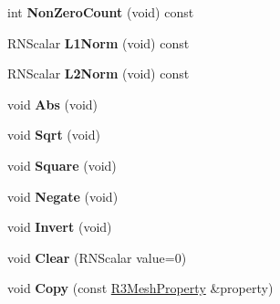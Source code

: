 \begin{DoxyCompactItemize}
\item 
int {\bfseries Non\+Zero\+Count} (void) const \hypertarget{struct_r3_mesh_property_ad5075bcb7fc35636d7ecd8b8ab838c62}{}\label{struct_r3_mesh_property_ad5075bcb7fc35636d7ecd8b8ab838c62}

\item 
R\+N\+Scalar {\bfseries L1\+Norm} (void) const \hypertarget{struct_r3_mesh_property_ac8a5f4c63e45060b385a802dcf44a123}{}\label{struct_r3_mesh_property_ac8a5f4c63e45060b385a802dcf44a123}

\item 
R\+N\+Scalar {\bfseries L2\+Norm} (void) const \hypertarget{struct_r3_mesh_property_a46f52050fbbcce0aadc880084fb2b947}{}\label{struct_r3_mesh_property_a46f52050fbbcce0aadc880084fb2b947}

\item 
void {\bfseries Abs} (void)\hypertarget{struct_r3_mesh_property_a8dbfd88e67b2d6f5027791732e8f75e2}{}\label{struct_r3_mesh_property_a8dbfd88e67b2d6f5027791732e8f75e2}

\item 
void {\bfseries Sqrt} (void)\hypertarget{struct_r3_mesh_property_a447368b6d646f5824f22b4fed224be4a}{}\label{struct_r3_mesh_property_a447368b6d646f5824f22b4fed224be4a}

\item 
void {\bfseries Square} (void)\hypertarget{struct_r3_mesh_property_abb1f9c252827fbd2ca96e561aab2f5c6}{}\label{struct_r3_mesh_property_abb1f9c252827fbd2ca96e561aab2f5c6}

\item 
void {\bfseries Negate} (void)\hypertarget{struct_r3_mesh_property_a2d18d45858bc283a678968937f00ee3a}{}\label{struct_r3_mesh_property_a2d18d45858bc283a678968937f00ee3a}

\item 
void {\bfseries Invert} (void)\hypertarget{struct_r3_mesh_property_a9b93852460392b413622096813a85e4a}{}\label{struct_r3_mesh_property_a9b93852460392b413622096813a85e4a}

\item 
void {\bfseries Clear} (R\+N\+Scalar value=0)\hypertarget{struct_r3_mesh_property_af9145a967004a86c7ba69d486c663ed3}{}\label{struct_r3_mesh_property_af9145a967004a86c7ba69d486c663ed3}

\item 
void {\bfseries Copy} (const \hyperlink{struct_r3_mesh_property}{R3\+Mesh\+Property} \&property)\hypertarget{struct_r3_mesh_property_ad96de5eb5f5367236d36437935b4cca8}{}\label{struct_r3_mesh_property_ad96de5eb5f5367236d36437935b4cca8}


\end{DoxyCompactItemize}
